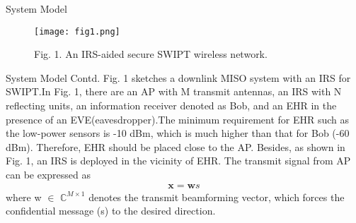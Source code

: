 \documentclass{beamer}
\newcommand\norm[1]{\left\lVert#1\right\rVert}
\begin{document}
\begin{frame}{System Model}
    \begin{figure}[htp]
    \centering
    \texttt{[image: fig1.png]}
    \caption{Fig. 1. An IRS-aided secure SWIPT wireless network.}
    \label{Fig. 1.}
\end{figure}
\end{frame}

\begin{frame}{System Model Contd.} 
Fig. 1 sketches a downlink MISO system with an IRS
for SWIPT.In Fig. 1, there are an AP with M transmit
antennas, an IRS with N reflecting units, an information receiver denoted as Bob, and an EHR in the presence of an EVE(eavesdropper).The minimum requirement for EHR such as the low-power
sensors is -10 dBm, which is much higher than that for Bob
(-60 dBm). Therefore, EHR should be placed close to the
AP. Besides, as shown in Fig. 1, an IRS is deployed in the
vicinity of EHR. The transmit signal from AP
can be expressed as
\begin{align}
    \textbf{x}=\textbf{w}s
\end{align}
where w $\in$ $\mathbb{C}^{M \times 1}$ denotes the transmit beamforming vector,
which forces the confidential message (s) to the desired direction.
\end{frame}

\end{document}
